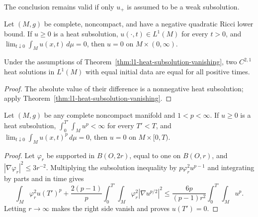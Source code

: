 \begin{remark}
\label{rem:evolving-wmp-positive-part}
The conclusion remains valid if only $u_+$ is assumed to be a weak
subsolution.
\end{remark}

\begin{theorem}[$L^1$ vanishing]
\label{thm:l1-heat-subsolution-vanishing}
Let $(M,g)$ be complete, noncompact, and have a negative quadratic Ricci lower
bound.  If $u\geq0$ is a heat subsolution,
$u(\cdot,t)\in L^1(M)$ for every $t>0$, and
$\lim_{t\downarrow0}\int_Mu(x,t)\,d\mu=0$, then $u=0$ on
$M\times(0,\infty)$.
\end{theorem}

\begin{corollary}[$L^1$ uniqueness]
\label{cor:l1-heat-uniqueness}
Under the assumptions of Theorem~\ref{thm:l1-heat-subsolution-vanishing}, two
$C^{2,1}$ heat solutions in $L^1(M)$ with equal initial data are equal for all
positive times.
\end{corollary}

\begin{proof}
\sketch
The absolute value of their difference is a nonnegative heat subsolution;
apply Theorem~\ref{thm:l1-heat-subsolution-vanishing}.
\end{proof}

\begin{theorem}
\label{thm:lp-heat-subsolution-vanishing}
Let $(M,g)$ be any complete noncompact manifold and $1<p<\infty$.  If
$u\geq0$ is a heat subsolution,
$\int_0^{T'}\int_Mu^p<\infty$ for every $T'<T$, and
$\lim_{t\downarrow0}\int_Mu(x,t)^p\,d\mu=0$, then
$u=0$ on $M\times[0,T)$.
\end{theorem}

\begin{proof}
\sketch
{}
Let $\varphi_r$ be supported in $B(O,2r)$, equal to one on $B(O,r)$, and
$|\nabla\varphi_r|^2\leq3r^{-2}$.  Multiplying the subsolution inequality by
$p\varphi_r^2u^{p-1}$ and integrating by parts and in time gives
\[
\int_M\varphi_r^2u(T')^p+
\frac{2(p-1)}p\int_0^{T'}\!\int_M
\varphi_r^2|\nabla u^{p/2}|^2
\leq\frac{6p}{(p-1)r^2}\int_0^{T'}\!\int_Mu^p.
\]
Letting $r\to\infty$ makes the right side vanish and proves $u(T')=0$.
\end{proof}


